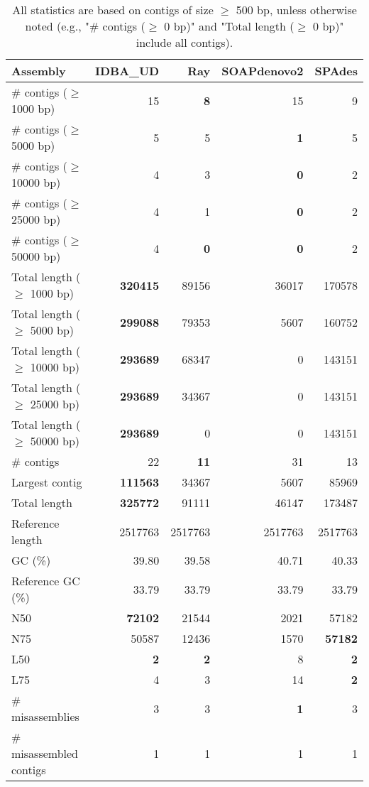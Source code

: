 \documentclass[12pt,a4paper]{article}
\begin{document}
\begin{table}[ht]
\begin{center}
\caption{All statistics are based on contigs of size $\geq$ 500 bp, unless otherwise noted (e.g., "\# contigs ($\geq$ 0 bp)" and "Total length ($\geq$ 0 bp)" include all contigs).}
\begin{tabular}{|l*{4}{|r}|}
\hline
Assembly & IDBA\_UD & Ray & SOAPdenovo2 & SPAdes \\ \hline
\# contigs ($\geq$ 1000 bp) & 15 & {\bf 8} & 15 & 9 \\ \hline
\# contigs ($\geq$ 5000 bp) & 5 & 5 & {\bf 1} & 5 \\ \hline
\# contigs ($\geq$ 10000 bp) & 4 & 3 & {\bf 0} & 2 \\ \hline
\# contigs ($\geq$ 25000 bp) & 4 & 1 & {\bf 0} & 2 \\ \hline
\# contigs ($\geq$ 50000 bp) & 4 & {\bf 0} & {\bf 0} & 2 \\ \hline
Total length ($\geq$ 1000 bp) & {\bf 320415} & 89156 & 36017 & 170578 \\ \hline
Total length ($\geq$ 5000 bp) & {\bf 299088} & 79353 & 5607 & 160752 \\ \hline
Total length ($\geq$ 10000 bp) & {\bf 293689} & 68347 & 0 & 143151 \\ \hline
Total length ($\geq$ 25000 bp) & {\bf 293689} & 34367 & 0 & 143151 \\ \hline
Total length ($\geq$ 50000 bp) & {\bf 293689} & 0 & 0 & 143151 \\ \hline
\# contigs & 22 & {\bf 11} & 31 & 13 \\ \hline
Largest contig & {\bf 111563} & 34367 & 5607 & 85969 \\ \hline
Total length & {\bf 325772} & 91111 & 46147 & 173487 \\ \hline
Reference length & 2517763 & 2517763 & 2517763 & 2517763 \\ \hline
GC (\%) & 39.80 & 39.58 & 40.71 & 40.33 \\ \hline
Reference GC (\%) & 33.79 & 33.79 & 33.79 & 33.79 \\ \hline
N50 & {\bf 72102} & 21544 & 2021 & 57182 \\ \hline
N75 & 50587 & 12436 & 1570 & {\bf 57182} \\ \hline
L50 & {\bf 2} & {\bf 2} & 8 & {\bf 2} \\ \hline
L75 & 4 & 3 & 14 & {\bf 2} \\ \hline
\# misassemblies & 3 & 3 & {\bf 1} & 3 \\ \hline
\# misassembled contigs & 1 & 1 & 1 & 1 \\ \hline

\end{tabular}
\end{center}
\end{table}
\end{document}
